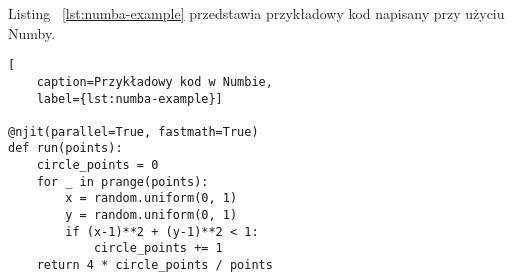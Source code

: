 Listing ~\ref{lst:numba-example} przedstawia przykładowy kod napisany
przy użyciu Numby.

\begin{lstlisting}[
    caption=Przykładowy kod w Numbie,
    label={lst:numba-example}]

@njit(parallel=True, fastmath=True)
def run(points):
    circle_points = 0
    for _ in prange(points):
        x = random.uniform(0, 1)
        y = random.uniform(0, 1)
        if (x-1)**2 + (y-1)**2 < 1:
            circle_points += 1
    return 4 * circle_points / points
\end{lstlisting}

